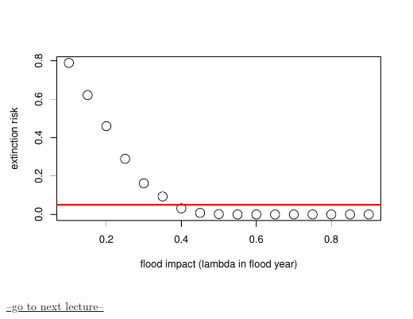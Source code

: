 \documentclass[
]{article}
\begin{document}
\includegraphics{LECTURE12_files/figure-latex/unnamed-chunk-9-1.pdf}

\href{LECTURE13.html}{--go to next lecture--}
\end{document}
